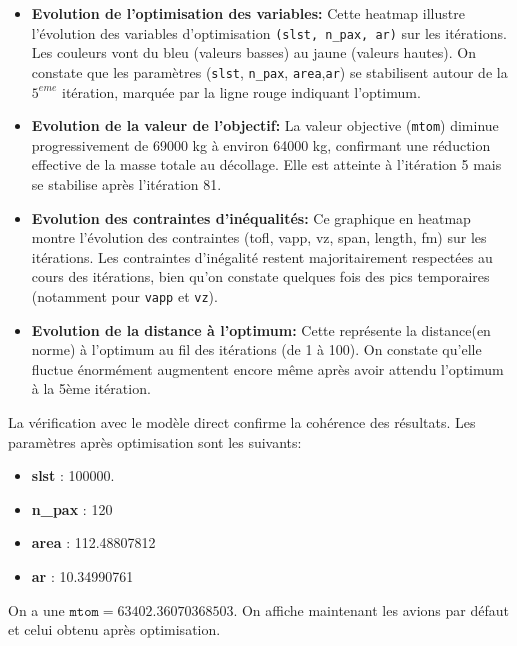 \documentclass[a4paper, 11pt]{article}
\begin{document}
\begin{itemize}

    \item \textbf{Evolution de l'optimisation des variables:} Cette heatmap illustre l'évolution des variables d'optimisation \texttt{(slst, n\_pax, ar)} sur les itérations. Les couleurs vont du bleu (valeurs basses) au jaune (valeurs hautes). On constate que les paramètres (\texttt{slst}, \texttt{n\_pax}, \texttt{area},\texttt{ar}) se stabilisent autour de la $5^{eme}$ itération, marquée par la ligne rouge indiquant l'optimum.

    \item \textbf{Evolution de la valeur de l'objectif:} La valeur objective (\texttt{mtom}) diminue progressivement de 69000 kg à environ 64000 kg, confirmant une réduction effective de la masse totale au décollage. Elle est atteinte à l'itération 5 mais se stabilise après l'itération 81.

    \item \textbf{Evolution des contraintes d'inéqualités:} Ce graphique en heatmap montre l'évolution des contraintes (tofl, vapp, vz, span, length, fm) sur les itérations. Les contraintes d'inégalité restent majoritairement respectées au cours des itérations, bien qu'on constate quelques fois des pics temporaires (notamment pour \texttt{vapp} et \texttt{vz}).
    
    \item \textbf{Evolution de la distance à l'optimum:} Cette représente la distance(en norme) à l'optimum au fil des itérations (de 1 à 100).  On constate qu'elle fluctue énormément augmentent encore même après avoir attendu l'optimum à la 5ème itération.

\end{itemize}

La vérification avec le modèle direct confirme la cohérence des résultats.
Les paramètres après optimisation sont les suivants:
\begin{itemize}
    \item \textbf{slst} : 100000.
    \item \textbf{n\_pax} : 120
    \item \textbf{area} : 112.48807812
    \item \textbf{ar} : 10.34990761
\end{itemize}
On a une $\texttt{mtom} = 63402.36070368503$. On affiche maintenant les avions par défaut et celui obtenu après optimisation.
\end{document}
